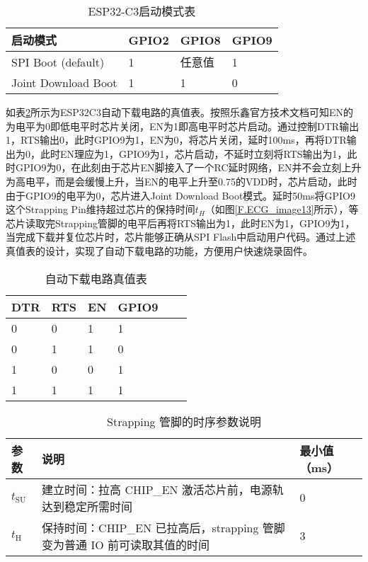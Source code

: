 \begin{table}[htb]
    \centering
    \caption{ESP32-C3启动模式表}
    \label{T.ESP32C3-startmode}
    \begin{tabular}{llll}
    \hline
    启动模式 & GPIO2 & GPIO8 & GPIO9 \\
    \hline
    SPI Boot (default) & 1 & 任意值 & 1 \\
    Joint Download Boot & 1 & 1 & 0 \\
    \hline
\end{tabular}
\end{table}

如表\ref{T.ESP32C3-autodownload}所示为ESP32C3自动下载电路的真值表。按照乐鑫官方技术文档\cite{espressif2021esp32c3}可知EN的为电平为0即低电平时芯片关闭，EN为1即高电平时芯片启动。通过控制DTR输出1，RTS输出0，此时GPIO9为1，EN为0，将芯片关闭，延时100ms，再将DTR输出为0，此时EN理应为1，GPIO9为1，芯片启动，不延时立刻将RTS输出为1，此时GPIO9为0，在此刻由于芯片EN脚接入了一个RC延时网络，EN并不会立刻上升为高电平，而是会缓慢上升，当EN的电平上升至0.75的VDD时，芯片启动，此时由于GPIO9的电平为0，芯片进入Joint Download Boot模式。延时50ms将GPIO9这个Strapping Pin维持超过芯片的保持时间$t_H$（如图\ref{F.ECG_image13}所示），等芯片读取完Strapping管脚的电平后再将RTS输出为1，此时EN为1，GPIO9为1，当完成下载并复位芯片时，芯片能够正确从SPI Flash中启动用户代码。通过上述真值表的设计，实现了自动下载电路的功能，方便用户快速烧录固件。

\begin{table}[htb]
    \centering
    \caption{自动下载电路真值表}
    \label{T.ESP32C3-autodownload}
    \begin{tabular}{llllll}
    \hline
    DTR & RTS & EN & GPIO9 \\
    \hline
    0 & 0 & 1 & 1 \\
    0 & 1 & 1 & 0 \\
    1 & 0 & 0 & 1 \\
    1 & 1 & 1 & 1 \\
    \hline
\end{tabular}
\end{table}

\begin{table}[htb]
    \centering
    \caption{Strapping 管脚的时序参数说明}
    \label{T.ESP32C3-strapping}
    \begin{tabular}{l p{8cm} l} %
    \hline
    \textbf{参数} & \textbf{说明} & \textbf{最小值（ms）} \\
    \hline
    $t_{\mathrm{SU}}$ & 建立时间：拉高 CHIP\_EN 激活芯片前，电源轨达到稳定所需时间 & 0 \\
    $t_{\mathrm{H}}$ & 保持时间：CHIP\_EN 已拉高后，strapping 管脚变为普通 IO 前可读取其值的时间 & 3 \\
    \hline
    \end{tabular}
\end{table}

